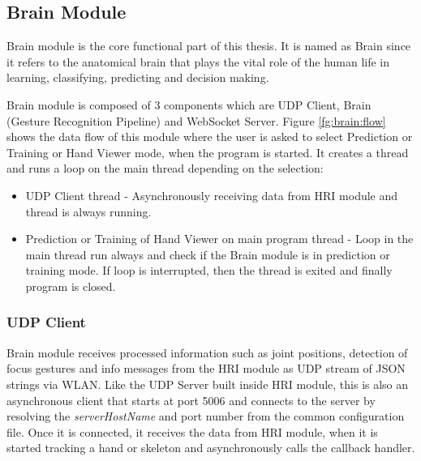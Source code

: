 \subsection{Brain Module} Brain module is the core functional part of this thesis. It is named as Brain since it refers to the anatomical brain that plays the vital role of the human life in learning, classifying, predicting and decision making. 

Brain module is composed of 3 components which are UDP Client, Brain (Gesture Recognition Pipeline) and WebSocket Server. Figure \ref{fg:brain:flow} shows the data flow of this module where the user is asked to select Prediction or Training or Hand Viewer mode, when the program is started. It creates a thread and runs a loop on the main thread depending on the selection: 
\begin{itemize}
	\item UDP Client thread - Asynchronously receiving data from HRI module and thread is always running. 
	\item Prediction or Training of Hand Viewer on main program thread - Loop in the main thread run always and check if the Brain module is in prediction or training mode. If loop is interrupted, then the thread is exited and finally program is closed. 
\end{itemize}



\subsubsection{UDP Client} Brain module receives processed information such as joint positions, detection of focus gestures and info messages from the HRI module as UDP stream of JSON strings via WLAN. Like the UDP Server built inside HRI module, this is also an asynchronous client that starts at port 5006 and connects to the server by resolving the \textit{serverHostName} and port number from the common configuration file. Once it is connected, it receives the data from HRI module, when it is started tracking a hand or skeleton and asynchronously calls the callback handler.

